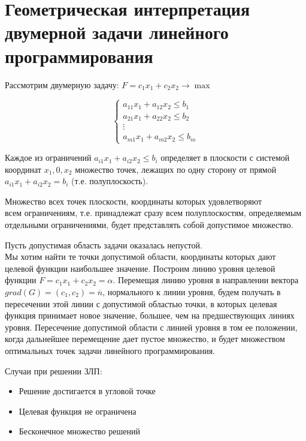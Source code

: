 \documentclass[17pt]{extarticle}
\begin{document}
\section{Геометрическая интерпретация двумерной задачи линейного программирования}

Рассмотрим двумерную задачу: \(F = c_1 x_1 + c_2 x_2 \rightarrow \max\)

\[
    \begin{cases}
        a_{11}x_1 + a_{12}x_2 \leq b_1 \\
        a_{21}x_1 + a_{22}x_2 \leq b_2 \\
        \vdots                         \\
        a_{m1}x_1 + a_{m2}x_2 \leq b_m
    \end{cases}
\]

Каждое из ограничений \( a_{i1} x_1 + a_{i2} x_2 \leq b_i \) определяет в плоскости с системой координат \( x_1, 0, x_2 \) множество точек,
лежащих по одну сторону от прямой \( a_{i1} x_1 + a_{i2} x_2 = b_i \) (т.е. полуплоскость).

Множество всех точек плоскости, координаты которых удовлетворяют \\ всем ограничениям, т.е. принадлежат сразу всем полуплоскостям,
определяемым отдельными ограничениями, будет представлять собой допустимое множество.

Пусть допустимая область задачи оказалась непустой. \\
Мы хотим найти те точки допустимой области, координаты которых дают
целевой функции наибольшее значение.
Построим линию уровня целевой функции $F = c_1 x_1 + c_2 x_2 = \alpha$.
Перемещая линию уровня в направлении вектора $grad(G)=(c_1, c_2)=\overline{n}$,
нормального к линии уровня, будем получать в пересечении этой линии
с допустимой областью точки, в которых целевая функция принимает
новое значение, большее, чем на предшествующих линиях уровня.
Пересечение допустимой области с линией уровня в том ее положении,
когда дальнейшее перемещение дает пустое множество, и будет
множеством оптимальных точек задачи линейного программирования.

Случаи при решении ЗЛП:
\begin{itemize}
    \item Решение достигается в угловой точке
    \item Целевая функция не ограничена
    \item Бесконечное множество решений
\end{itemize}
\end{document}
